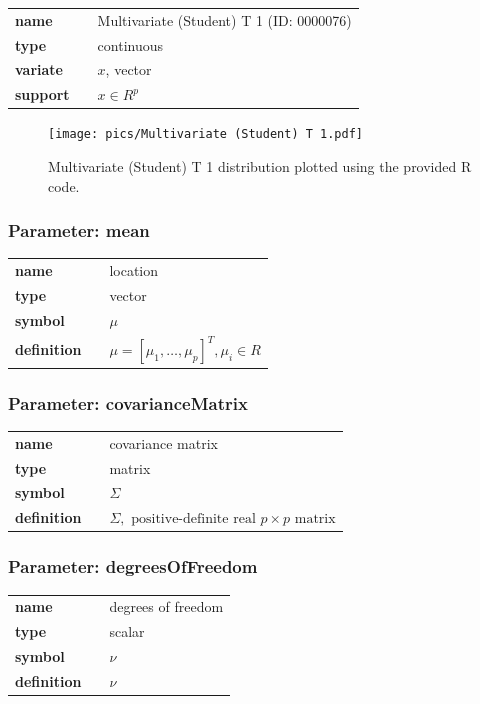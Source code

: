 \documentclass{article}
\begin{document}
  \bigskip 

\begin{tabular}{p{2cm}cl}
\textbf{name} & & Multivariate (Student) T 1 (ID: 0000076)\\ 
 
\textbf{type} & & continuous \\ 

\textbf{variate} & & $x$, vector \\ 

\textbf{support} & & $x \in R^p$
\end{tabular}

\begin{figure}[ht!]
\centering
  \texttt{[image: pics/Multivariate (Student) T 1.pdf]}
 \caption{Multivariate (Student) T 1 distribution plotted using the provided R code.}
 \label{fig:Multivariate (Student) T 1}
\end{figure}

\subsubsection*{Parameter: mean}

\noindent\begin{tabular}{p{2cm}cl}
\textbf{name} & & location \\
\textbf{type} & & vector \\
\textbf{symbol} & & $\mu$  \\
\textbf{definition} & & $\mu = [\mu_1, \dots, \mu_p]^T, \mu_i \in R$
\end{tabular}
\subsubsection*{Parameter: covarianceMatrix}

\noindent\begin{tabular}{p{2cm}cl}
\textbf{name} & & covariance matrix \\
\textbf{type} & & matrix \\
\textbf{symbol} & & $\Sigma$  \\
\textbf{definition} & & $\Sigma, \text{ positive-definite real } p\times p \text{ matrix}$
\end{tabular}
\subsubsection*{Parameter: degreesOfFreedom}

\noindent\begin{tabular}{p{2cm}cl}
\textbf{name} & & degrees of freedom \\
\textbf{type} & & scalar \\
\textbf{symbol} & & $\nu$  \\
\textbf{definition} & & $\nu$
\end{tabular}
\end{document}
